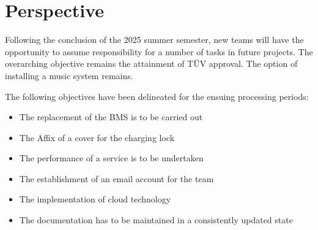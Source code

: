 \section*{Perspective}
%
%

%
Following the conclusion of the 2025 summer semester, new teams will have the opportunity to assume responsibility for a number of tasks in future projects.
The overarching objective remains the attainment of TÜV approval.
The option of installing a music system remains.

The following objectives have been delineated for the ensuing processing periods:

\begin{itemize}
	\item The replacement of the BMS is to be carried out
\item The Affix of a cover for the charging lock
\item The performance of a service is to be undertaken
\item The establishment of an email account for the team
\item The implementation of cloud technology
\item The documentation has to be maintained in a consistently updated state
	
\end{itemize}
